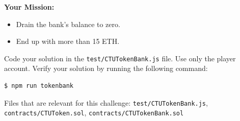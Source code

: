 \documentclass[12pt]{article}
\begin{document}
\medskip
\noindent
\textbf{Your Mission:}
\begin{itemize}
    \item Drain the bank's balance to zero.
    \item End up with more than 15 ETH.
\end{itemize}

\noindent
Code your solution in the \texttt{test/CTUTokenBank.js} file. Use only the player account. Verify your solution by running the following command:

\begin{verbatim}
$ npm run tokenbank
\end{verbatim}

\noindent
Files that are relevant for this challenge: \texttt{test/CTUTokenBank.js}, \texttt{contracts/CTUToken.sol}, \texttt{contracts/CTUTokenBank.sol}
\end{document}

